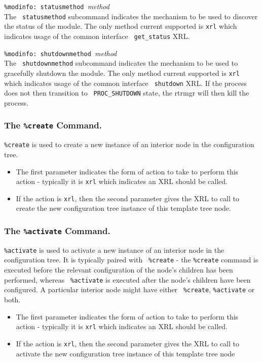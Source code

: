 \documentclass[11pt]{article}
\begin{document}
\begin{description}
\item {{\tt \%modinfo: statusmethod }{\it method}}  \\The {\tt
statusmethod} subcommand indicates the mechanism to be used to
discover the status of the module.  The only method current supported
is {\tt xrl} which indicates usage of the common interface {\tt
get\_status} XRL.

\item {{\tt \%modinfo: shutdownmethod }{\it method}}  \\The {\tt
shutdownmethod} subcommand indicates the mechanism to be used to
gracefully shutdown the module.  The only method current supported
is {\tt xrl} which indicates usage of the common interface {\tt
shutdown} XRL.  If the process does not then transition to {\tt
PROC\_SHUTDOWN} state, the rtrmgr will then kill the process.
\end{description}
\subsubsection{The {\tt \%create} Command.}
{\tt \%create} is used to create a new instance of an interior node in
the configuration tree.  
\begin{itemize}
\item The first parameter indicates the form of
action to take to perform this action - typically it is {\tt xrl}
which indicates an XRL should be called.  
\item If the action is {\tt xrl}, then the second parameter gives the XRL to
call to create the new configuration tree instance of this template
tree node.
\end{itemize}

\subsubsection{The {\tt \%activate} Command.}
{\tt \%activate} is used to activate a new instance of an interior
node in the configuration tree.  It is typically paired with {\tt
\%create} - the {\tt \%create} command is executed before the relevant
configuration of the node's children has been performed, whereas {\tt
\%activate} is executed after the node's children have been
configured.  A particular interior node might have either {\tt
\%create}, {\tt \%activate} or both.
\begin{itemize}
\item The first parameter indicates the form of action to take to perform
this action - typically it is {\tt xrl} which indicates an XRL should
be called.
\item If the action is {\tt xrl}, then the second parameter gives the XRL to
call to activate the new configuration tree instance of this template
tree node
\end{itemize}
\end{document}
